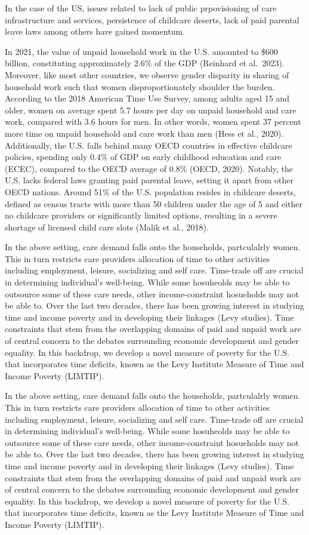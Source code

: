 \documentclass[
  11pt,
]{article}
\begin{document}
In the case of the US, issues related to lack of public prpovisioning of
care infrastructure and services, persistence of childcare deserts, lack
of paid parental leave laws among others have gained momentum.

In 2021, the value of unpaid household work in the U.S. amounted to
\$600 billion, constituting approximately 2.6\% of the GDP (Reinhard et
al.~2023). Moreover, like most other countries, we observe gender
disparity in sharing of household work such that women
disproportionately shoulder the burden. According to the 2018 American
Time Use Survey, among adults aged 15 and older, women on average spent
5.7 hours per day on unpaid household and care work, compared with 3.6
hours for men. In other words, women spent 37 percent more time on
unpaid household and care work than men (Hess et al., 2020).
Additionally, the U.S. falls behind many OECD countries in effective
childcare policies, spending only 0.4\% of GDP on early childhood
education and care (ECEC), compared to the OECD average of 0.8\% (OECD,
2020). Notably, the U.S. lacks federal laws granting paid parental
leave, setting it apart from other OECD nations. Around 51\% of the U.S.
population resides in childcare deserts, defined as census tracts with
more than 50 children under the age of 5 and either no childcare
providers or significantly limited options, resulting in a severe
shortage of licensed child care slots (Malik et al., 2018).

In the above setting, care demand falls onto the households,
partculalrly women. This in turn restricts care providers allocation of
time to other activities including employment, leisure, socializing and
self care. Time-trade off are crucial in determining individual's
well-being. While some hosuheolds may be able to outsource some of these
care needs, other income-constraint hosueholds may not be able to. Over
the last two decades, there has been growing interest in studying time
and income poverty and in developing their linkages (Levy studies). Time
constraints that stem from the overlapping domains of paid and unpaid
work are of central concern to the debates surrounding economic
development and gender equality. In this backdrop, we develop a novel
measure of poverty for the U.S. that incorporates time deficits, known
as the Levy Institute Measure of Time and Income Poverty (LIMTIP).

In the above setting, care demand falls onto the households,
partculalrly women. This in turn restricts care providers allocation of
time to other activities including employment, leisure, socializing and
self care. Time-trade off are crucial in determining individual's
well-being. While some hosuheolds may be able to outsource some of these
care needs, other income-constraint hosueholds may not be able to. Over
the last two decades, there has been growing interest in studying time
and income poverty and in developing their linkages (Levy studies). Time
constraints that stem from the overlapping domains of paid and unpaid
work are of central concern to the debates surrounding economic
development and gender equality. In this backdrop, we develop a novel
measure of poverty for the U.S. that incorporates time deficits, known
as the Levy Institute Measure of Time and Income Poverty (LIMTIP).
\end{document}
